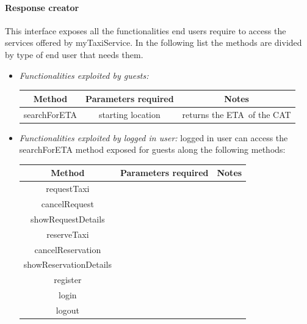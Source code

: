 \documentclass{article}
\begin{document}
\paragraph{Response creator}
This interface exposes all the functionalities end users require to access the services offered by myTaxiService. 
In the following list the methods are divided by type of end user that needs them.
\begin{itemize}
	\item \textit{Functionalities exploited by guests:}	\\
	\begin{table}[H]
		\begin{adjustbox}{width=1.2\textwidth}
			\begin{tabular}{*{3}{c}}
				\toprule
				Method & Parameters required & Notes \\
				\midrule
				searchForETA & starting location & returns the ETA\footnotemark\  of the CAT\footnotemark\\ %
				\bottomrule
			\end{tabular}
	\end{adjustbox}
\end{table}

	\item \textit{Functionalities exploited by logged in user:} logged in user can access the searchForETA method exposed for guests along the following methods:
	\begin{table}[H]
		\begin{adjustbox}{width=1.2\textwidth}
			\begin{tabular}{*{3}{c}}
				\toprule
				Method & Parameters required & Notes \\
				\midrule
				requestTaxi &  & \\ %
				cancelRequest & & \\ %
				showRequestDetails & & \\
				reserveTaxi & &  \\
				cancelReservation & & \\
				showReservationDetails & & \\
				register & & \\
				login & & \\
				logout & & \\
				\bottomrule
			\end{tabular}
		\end{adjustbox}
	\end{table}
		

\end{itemize}
\end{document}
